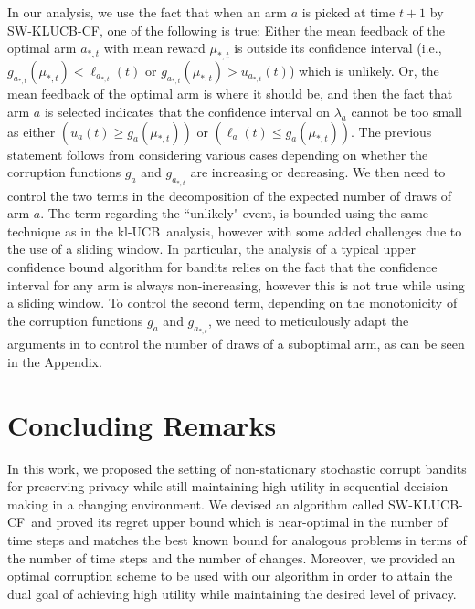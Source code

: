 \documentclass[letterpaper]{article} %
\newcommand{\SWKLUCBCF}{\textsc{SW-KLUCB-CF}}
\newcommand{\KLUCB}{$\mathrm{kl}$-\textsc{UCB}}
\newcommand{\optArm}[1]{a_{*, #1}}
\newcommand{\optMean}[1]{\mu_{*, #1}}
\begin{document}
In our analysis, we use the fact that when an arm $a$ is picked at time $t+1$ by \SWKLUCBCF, one of the following is true:
Either the mean feedback of the optimal arm $\optArm{t}$ with mean reward $\optMean{t}$ is outside its confidence interval (i.e., $g_{\optArm{t}}(\optMean{t}) < \ell_{\optArm{t}}(t)$ or $g_{\optArm{t}}(\optMean{t}) > u_{\optArm{t}}(t)$) which is unlikely. Or,
the mean feedback of the optimal arm is where it should be, and then the fact that arm $a$ is selected indicates that the confidence interval on $\lambda_a$ cannot be too small as either $(u_a(t) \geq g_a(\optMean{t}))$ or $(\ell_a(t) \leq g_a(\optMean{t}))$.
The previous statement follows from considering various cases depending on whether the corruption functions $g_a$ and $g_{\optArm{t}}$ are increasing or decreasing.
We then need to control the two terms in the decomposition of the expected number of draws of arm $a$. The term regarding the ``unlikely" event, is bounded using the same technique as in the \KLUCB \ analysis, however with some added challenges due to the use of a sliding window. In particular, the analysis of a typical upper confidence bound algorithm for bandits relies on the fact that the confidence interval for any arm is always non-increasing, however this is not true while using a sliding window. To control the second term, depending on the monotonicity of the corruption functions $g_a$ and $g_{\optArm{t}}$, we need to meticulously adapt the arguments in \citet{KLUCBJournal} to control the number of draws of a suboptimal arm, as can be seen in the Appendix.

\vspace{-2.51mm}
\section{Concluding Remarks}
In this work, we proposed the setting of non-stationary stochastic corrupt bandits for preserving privacy while still maintaining high utility in sequential decision making in a changing environment. We devised an algorithm called \SWKLUCBCF \ and proved its regret upper bound which is near-optimal in the number of time steps and matches the best known bound for analogous problems in terms of the number of time steps and the number of changes. Moreover, we provided an optimal corruption scheme to be used with our algorithm in order to attain the dual goal of achieving high utility while maintaining the desired level of privacy.
\end{document}
